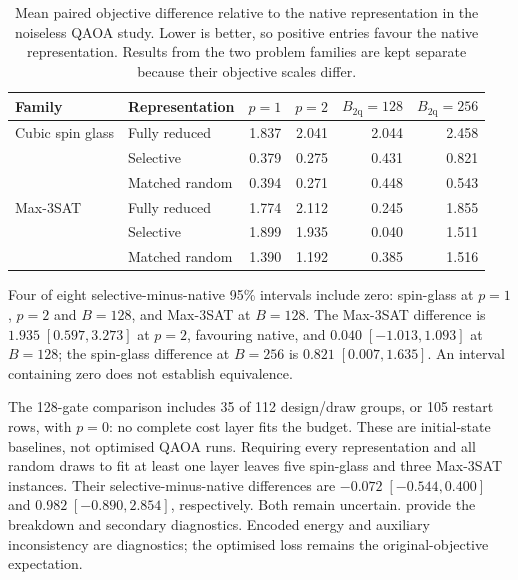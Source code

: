 \documentclass[a4paper,onecolumn,11pt,unpublished]{quantumarticle}
\theoremstyle{remark}
\begin{document}
\begin{table}[!htbp]
    \centering
    \small
    \caption{Mean paired objective difference relative to the native
    representation in the noiseless QAOA study.  Lower is better, so positive
    entries favour the native representation.  Results from the two problem
    families are kept separate because their objective scales differ.}
    \label{tab:e3-qaoa-summary}
    \begin{tabular}{@{}llrrrr@{}}
        \toprule
        Family & Representation
        & $p=1$ & $p=2$
        & $B_{\mathrm{2q}}=128$
        & $B_{\mathrm{2q}}=256$\\
        \midrule
        Cubic spin glass
        & Fully reduced  & 1.837 & 2.041 & 2.044 & 2.458\\
        & Selective      & 0.379 & 0.275 & 0.431 & 0.821\\
        & Matched random & 0.394 & 0.271 & 0.448 & 0.543\\
        \addlinespace
        Max-3SAT
        & Fully reduced  & 1.774 & 2.112 & 0.245 & 1.855\\
        & Selective      & 1.899 & 1.935 & 0.040 & 1.511\\
        & Matched random & 1.390 & 1.192 & 0.385 & 1.516\\
        \bottomrule
    \end{tabular}
\end{table}

Four of eight selective-minus-native 95\% intervals include zero: spin-glass
at $p=1$, $p=2$ and $B=128$, and Max-3SAT at $B=128$. The Max-3SAT difference is
$1.935\;[0.597,3.273]$ at $p=2$, favouring native, and
$0.040\;[-1.013,1.093]$ at $B=128$; the spin-glass difference at $B=256$
is $0.821\;[0.007,1.635]$. An interval containing zero does not
establish equivalence.

The 128-gate comparison includes 35 of 112 design/draw groups, or 105
restart rows, with $p=0$: no complete cost layer fits the budget. These are
initial-state baselines, not optimised QAOA runs. Requiring every
representation and all random draws to fit at least one layer leaves five
spin-glass and three Max-3SAT instances. Their selective-minus-native
differences are $-0.072\;[-0.544,0.400]$ and
$0.982\;[-0.890,2.854]$, respectively. Both remain uncertain.
 provide the breakdown and
secondary diagnostics. Encoded energy and auxiliary inconsistency are
diagnostics; the optimised loss remains the original-objective expectation.
\end{document}
